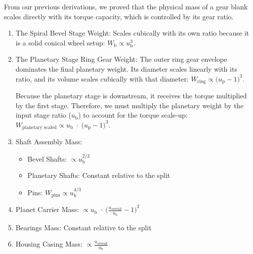    From our previous derivations, we proved that the physical mass of a gear blank scales directly 
    with its torque capacity, which is controlled by its gear ratio.
		\begin{enumerate}
            \item The Spiral Bevel Stage Weight: Scales cubically with its own ratio because 
            it is a solid conical wheel setup: $W_{\text{b}}\propto u_{\text{b}}^{3}$.
            
            \item The Planetary Stage Ring Gear Weight: The outer ring gear envelope dominates the 
            final planetary weight. Its diameter scales linearly with its ratio, and its volume 
            scales cubically with that diameter: $W_{\text{ring}}\propto {\bigl(u_{\text{p}}-1\bigr)}^{3}$.

            Because the planetary stage is downstream, it receives the torque multiplied 
            by the first stage. Therefore, we must multiply the planetary weight by the 
            input stage ratio ($u_{\text{b}}$) to account for the torque scale-up:
            $W_{\text{planetary scaled}}\propto u_{\text{b}}\;\cdot\;{\bigl(u_{\text{p}}-1\bigr)}^{3}$.
            
            \item Shaft Assembly Mass:
                \begin{itemize}
                    \item Bevel Shafts: $\propto u_{\text{b}}^{2/3}$
                    \item Planetary Shafts: Constant relative to the split
                    \item Pins: $W_{\text{pins}}\propto u_{\text{b}}^{4/3}$
                \end{itemize}

            \item Planet Carrier Mass: $\propto u_{\text{b}}\;\cdot\;{\bigl(\frac{u_{\text{overall}}}{u_{\text{b}}} - 1\bigr)}^{2}$

            \item Bearings Mass: Constant relative to the split

            \item Housing Casing Mass: $\propto \frac{u_{\text{overall}}}{u_{\text{b}}}$
        \end{enumerate}

